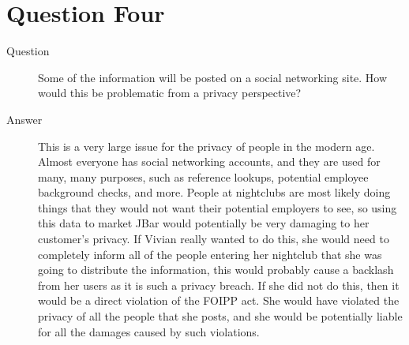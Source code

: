 \documentclass{article}
\numberwithin{equation}{section} %
\numberwithin{figure}{section} %
\numberwithin{table}{section} %
\begin{document}
\section {Question Four}
\begin{description}
	\item[Question] Some of the information will be posted on a social networking site. How would this be 
problematic from a privacy perspective? 
	\item [Answer] This is a very large issue for the privacy of people in the modern age.  Almost everyone has social networking accounts, and they are used for many, many purposes, such as reference lookups, potential employee background checks, and more.  People at nightclubs are most likely doing things that they would not want their potential employers to see, so using this data to market JBar would potentially be very damaging to her customer's privacy.  If Vivian really wanted to do this, she would need to completely inform all of the people entering her nightclub that she was going to distribute the information, this would probably cause a backlash from her users as it is such a privacy breach.  If she did not do this, then it would be a direct violation of the FOIPP act.  She would have violated the privacy of all the people that she posts, and she would be potentially liable for all the damages caused by such violations.
\end{description}
\end{document}
